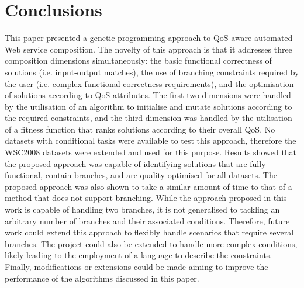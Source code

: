 \documentclass[conference]{IEEEtran}
\begin{document}
\section{Conclusions}\label{conclusion}
This paper presented a genetic programming approach to QoS-aware automated Web service composition. The novelty of this approach is that it addresses three composition dimensions simultaneously: the basic functional correctness of solutions (i.e. input-output matches), the use of branching constraints required by the user (i.e. complex functional correctness requirements), and the optimisation of solutions according to QoS attributes. The first two dimensions were handled by the utilisation of an algorithm to initialise and mutate solutions according to the required constraints, and the third dimension was handled by the utilisation of a fitness function that ranks solutions according to their overall QoS. No datasets with conditional tasks were available to test this approach, therefore the WSC2008 datasets were extended and used for this purpose. Results showed that the proposed approach was capable of identifying solutions that are fully functional, contain branches, and are quality-optimised for all datasets. The proposed approach was also shown to take a similar amount of time to that of a method that does not support branching. While the approach proposed in this work is capable of handling two branches, it is not generalised to tackling an arbitrary number of branches and their associated conditions. Therefore, future work could extend this approach to flexibly handle scenarios that require several branches. The project could also be extended to handle more complex conditions, likely leading to the employment of a language to describe the constraints. Finally, modifications or extensions could be made aiming to improve the performance of the algorithms discussed in this paper.




\end{document}
